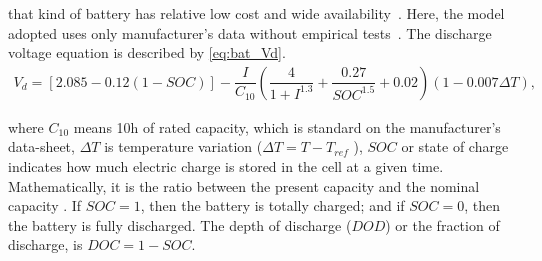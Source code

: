 \documentclass[review]{elsarticle}
\begin{document}
%
%
%
%
%
%
that kind of battery has relative low cost and wide availability~\cite{Copetti}. 
%
Here, the model adopted uses only manufacturer's data without empirical tests~\cite{Copetti}. %
%
The discharge voltage equation is described by \eqref{eq:bat_Vd}.
%
\begin{multline}
\label{eq:bat_Vd}
V_{d} = \left[ 2.085-0.12(1-SOC) \right] - \dfrac{I}{C_{10}} \left( \dfrac{4}{1+I^{1.3}} + \dfrac{0.27}{SOC^{1.5}}+0.02 \right) (1-0.007 \Delta T),
\end{multline}

\noindent where $C_{10}$ means 10h of rated capacity, which is standard on the manufacturer's data-sheet, $\Delta T$ is temperature variation ($\Delta T=T-T_{ref} $%
), $ SOC $ or state of charge indicates how much electric charge is stored in the cell at a given time. Mathematically, it is the ratio between the present capacity and the nominal capacity%
. If $SOC=1$, then the battery is totally charged; and if $ SOC=0 $, then the battery is fully discharged.  %
%
%
The depth of discharge ($DOD$) or the fraction of discharge, is $DOC=1-SOC$.
\end{document}

